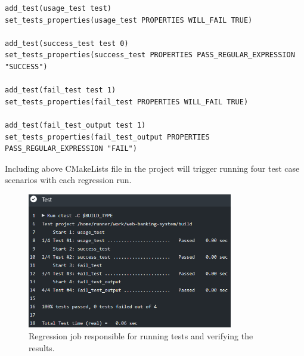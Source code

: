 \documentclass[a4paper,12pt]{book}
\begin{document}
{\begin{lstlisting}
add_test(usage_test test)
set_tests_properties(usage_test PROPERTIES WILL_FAIL TRUE)

add_test(success_test test 0)
set_tests_properties(success_test PROPERTIES PASS_REGULAR_EXPRESSION "SUCCESS")

add_test(fail_test test 1)
set_tests_properties(fail_test PROPERTIES WILL_FAIL TRUE)

add_test(fail_test_output test 1)
set_tests_properties(fail_test_output PROPERTIES PASS_REGULAR_EXPRESSION "FAIL")
\end{lstlisting}

\bigskip Including above CMakeLists file in the project will trigger running four test case scenarios with each regression run.

\begin{figure}[h]
  \centering
    \includegraphics[width=0.8\textwidth]{testreg}
    \caption{Regression job responsible for running tests and verifying the results.}
\end{figure}
}
\end{document}
